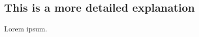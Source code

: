 \documentclass[../main.tex]{subfiles}
\begin{document}
    
\subsection{This is a more detailed explanation}

Lorem ipsum.
\end{document}
